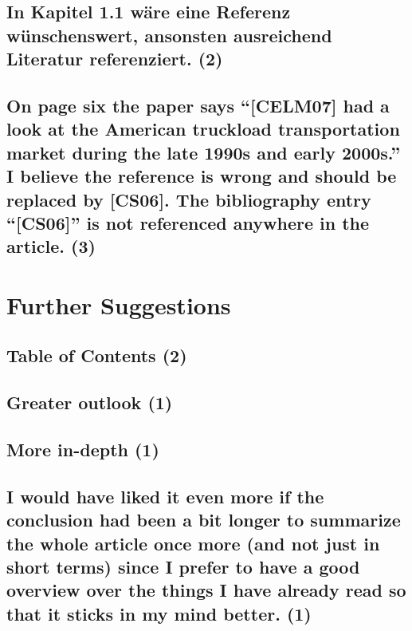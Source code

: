 \documentclass{"../../Datenanalyse/assignments/latex-brookesassignment/brookes-assignment"}
\begin{document}
\subsection{In Kapitel 1.1 wäre eine Referenz wünschenswert, ansonsten ausreichend Literatur referenziert. (2)}
\subsection{On page six the paper says ``[CELM07] had a look at the American truckload transportation market during the late 1990s and early 2000s.'' I believe the reference is wrong and should be replaced by [CS06]. The bibliography entry ``[CS06]'' is not referenced anywhere in the article. (3)}

\section{Further Suggestions}
\subsection{Table of Contents (2)}
\subsection{Greater outlook (1)}
\subsection{More in-depth (1)}
\subsection{I would have liked it even more if the conclusion had been a bit longer to summarize the whole article once more (and not just in short terms) since I prefer to have a good overview over the things I have already read so that it sticks in my mind better. (1)}
\end{document}
